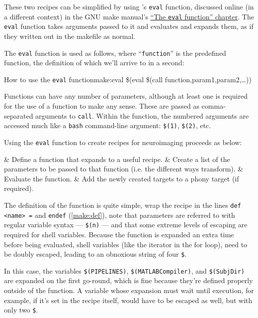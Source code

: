 These two recipes can be simplified by using \maken{}'s \texttt{eval} function, discussed online (in a different context) in the GNU make manual's \href{https://www.gnu.org/software/make/manual/make.html#Eval-Function}{``The \texttt{eval} function'' chapter}. The \texttt{eval} function takes arguments passed to it and evaluates and expands them, as if they written out in the makefile as normal.

The \texttt{eval} function is used as follows, where ``\texttt{function}'' is the predefined function, the definition of which we'll arrive to in a second: 
\begin{make}{How to use the \texttt{eval} function}{make:eval}
	\$(eval \$(call function,param1,param2,\ldots))
\end{make}

Functions can have any number of parameters, although at least one is required for the use of a function to make any sense. These are passed as comma-separated arguments to \texttt{call}. Within the function, the numbered arguments are accessed much like a \texttt{bash} command-line argument: \texttt{\$(1)}, \texttt{\$(2)}, etc.

Using the \texttt{eval} function to create recipes for neuroimaging proceeds as below:

\vspace{0.5\baselineskip}

\begin{easylist}[enumerate]
	& Define a function that expands to a useful recipe.
	& Create a list of the parameters to be passed to that function (i.e. the different ways transform).
	& Evaluate the function.
	& Add the newly created targets to a phony target (if required).
\end{easylist}

\vspace{0.5\baselineskip}

The definition of the function is quite simple, wrap the recipe in the lines \texttt{def <name> =} and \texttt{endef} (\autoref{make:def}), note that parameters are referred to with regular \maken{} variable syntax --- \texttt{\$(n)} --- and that some extreme levels of escaping are required for shell variables. Because the function is expanded an extra time before being evaluated, shell variables (like the iterator in the for loop), need to be doubly escaped, leading to an obnoxious string of four \texttt{\$}.

In this case, the \maken{} variables \texttt{\$(PIPELINES)}, \texttt{\$(MATLABCompiler)}, and \texttt{\$(SubjDir)} are expanded on the first go-round, which is fine because they're defined properly outside of the function. A variable whose expansion must wait until execution, for example, if it's set in the recipe itself, would have to be escaped as well, but with only two \texttt{\$}.


